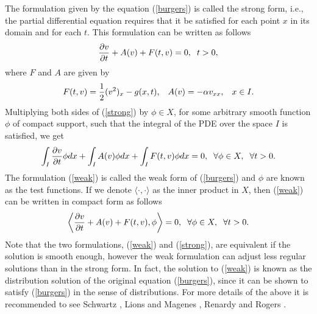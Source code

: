     The formulation given by the equation (\ref{burgers}) is called the strong form, i.e., the partial differential equation requires that it be satisfied for each point $x$ in its domain and for each $t$. This formulation can be written as follows
    \begin{equation}
    	\frac{\partial v}{\partial t} + A(v) + F(t, v) = 0, \hspace{2mm} t > 0,
    	\label{strong}
    \end{equation}
	where $F$ and $A$ are given by
	\begin{equation*}
		F(t, v) = \frac{1}{2} (v^2)_x - g(x, t), \hspace{3mm} A(v) = - \alpha v_{xx} , \hspace{3mm} x \in I.
	\end{equation*} 
	Multiplying both sides of (\ref{strong}) by $\phi \in X$, for some arbitrary smooth function $\phi$ of compact support, such that the integral of the PDE over the space $I$ is satisfied, we get   
    \begin{equation}
    	\displaystyle \int_{I} \frac{\partial v}{\partial t} \phi dx + \int_{I} A(v) \phi dx + \int_{I} F(t, v) \phi dx = 0, \hspace{2mm} \forall \phi \in X,\hspace{2mm} \forall t > 0.
    	\label{weak}
    \end{equation}
	The formulation (\ref{weak}) is called the weak form of (\ref{burgers}) and $\phi$ are known as the test functions.  If we denote $\langle \cdot, \cdot \rangle$ as the inner product in $X$, then (\ref{weak}) can be written in compact form as follows
    \begin{equation}
    	\left \langle \frac{\partial v}{\partial t} + A(v) + F(t, v), \phi\right\rangle = 0, \hspace{2mm} \forall \phi \in X, \hspace{2mm} \forall t > 0.	
    	\label{compact_weak}
    \end{equation}
	Note that the two formulations, (\ref{weak}) and (\ref{strong}), are equivalent if the solution is smooth enough, however the weak formulation can adjust less regular solutions than in the strong form. In fact, the solution to (\ref {weak}) is known as the distribution solution of the original equation (\ref{burgers}), since it can be shown to satisfy (\ref{burgers}) in the sense of distributions. For more details of the above it is recommended to see Schwartz \cite{Schwartz1966}, Lions and Magenes \cite{Lions1972}, Renardy and Rogers \cite{Renardy1993}. \\
	
